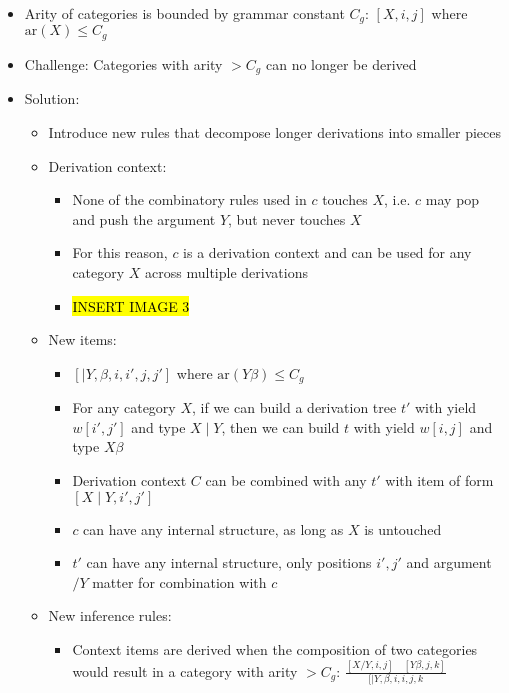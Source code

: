 \begin{itemize}
    \item Arity of categories is bounded by grammar constant $C_g$:
    $[X, i, j]$ where $\textrm{ar}(X) \leq C_g$
    \item Challenge: Categories with arity $> C_g$ can no longer be derived
    \item Solution:
    \begin{itemize}
        \item Introduce new rules that decompose longer derivations into smaller pieces
        \item Derivation context:
        \begin{itemize}
            \item None of the combinatory rules used in $c$ touches $X$, i.e. $c$ may pop and push the argument $Y$, but never touches $X$
            \item For this reason, $c$ is a derivation context and can be used for any category $X$ across multiple derivations
            \item \hl{INSERT IMAGE 3}
        \end{itemize}
        \item New items:
        \begin{itemize}
            \item $[\mid Y, \beta, i, i', j, j']$ where $\text{ar}(Y \beta) \leq C_g$
            \item For any category $X$, if we can build a derivation tree $t'$ with yield $w[i', j']$ and type $X \mid Y$, then we can build $t$ with yield $w[i, j]$ and type $X \beta$
            \item Derivation context $C$ can be combined with any $t'$ with item of form $[X \mid Y, i', j']$
            \item $c$ can have any internal structure, as long as $X$ is untouched
            \item $t'$ can have any internal structure, only positions $i',j'$ and argument $/Y$ matter for combination with $c$
        \end{itemize}
        \item New inference rules:
        \begin{itemize}
            \item Context items are derived when the composition of two categories would result in a category with arity $> C_g$:
            $
            \frac{[X / Y, i, j] \quad [Y \beta, j, k]}{[\mid Y, \beta, i, i, j, k}
            $ 

\end{itemize}
\end{itemize}
\end{itemize}
